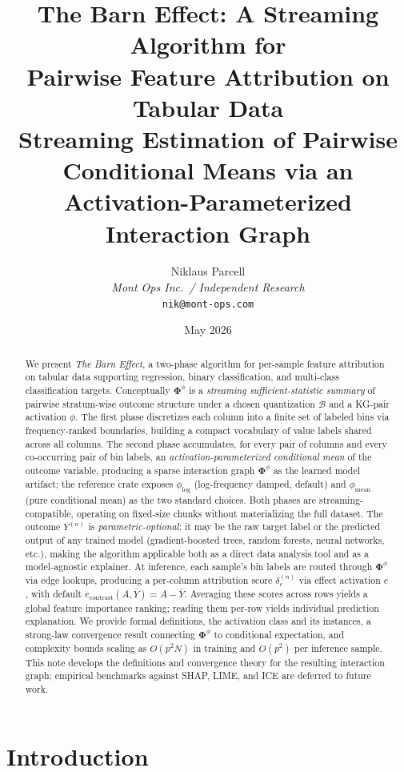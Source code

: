 \documentclass[11pt]{article}
\title{The Barn Effect: A Streaming Algorithm for\\
Pairwise Feature Attribution on Tabular Data\\
\large Streaming Estimation of Pairwise Conditional Means via an Activation-Parameterized Interaction Graph}
\author{Niklaus Parcell\\
\textit{Mont Ops Inc.\ / Independent Research}\\
\texttt{nik@mont-ops.com}}
\date{May 2026}
\begin{document}
\maketitle

\begin{abstract}
We present \emph{The Barn Effect}, a two-phase algorithm for per-sample feature attribution on tabular data supporting regression, binary classification, and multi-class classification targets.
Conceptually $\bm{\Phi}^\phi$ is a \emph{streaming sufficient-statistic summary} of pairwise stratum-wise outcome structure under a chosen quantization $\mathcal{B}$ and a KG-pair activation $\phi$.
The first phase discretizes each column into a finite set of labeled bins via frequency-ranked boundaries, building a compact vocabulary of value labels shared across all columns.
The second phase accumulates, for every pair of columns and every co-occurring pair of bin labels, an \emph{activation-parameterized conditional mean} of the outcome variable, producing a sparse interaction graph $\bm{\Phi}^\phi$ as the learned model artifact; the reference crate exposes $\phi_{\log}$ (log-frequency damped, default) and $\phi_{\mathrm{mean}}$ (pure conditional mean) as the two standard choices.
Both phases are streaming-compatible, operating on fixed-size chunks without materializing the full dataset.
The outcome $Y^{(n)}$ is \emph{parametric-optional}: it may be the raw target label or the predicted output of any trained model (gradient-boosted trees, random forests, neural networks, etc.), making the algorithm applicable both as a direct data analysis tool and as a model-agnostic explainer.
At inference, each sample's bin labels are routed through $\bm{\Phi}^\phi$ via edge lookups, producing a per-column attribution score $\delta_c^{(n)}$ via effect activation $e$, with default $e_{\mathrm{contrast}}(A, \bar{Y}) = A - \bar{Y}$.
Averaging these scores across rows yields a global feature importance ranking; reading them per-row yields individual prediction explanation.
We provide formal definitions, the activation class and its instances, a strong-law convergence result connecting $\bm{\Phi}^\phi$ to conditional expectation, and complexity bounds scaling as $O(p^2 N)$ in training and $O(p^2)$ per inference sample.
This note develops the definitions and convergence theory for the resulting interaction graph; empirical benchmarks against SHAP, LIME, and ICE are deferred to future work.
\end{abstract}

\section{Introduction}
\end{document}
